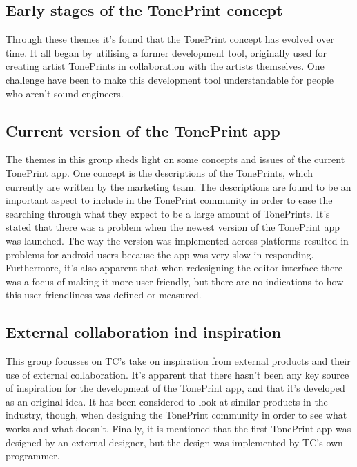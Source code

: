 \subsection*{Early stages of the TonePrint concept}
Through these themes it's found that the TonePrint concept has evolved over time. It all began by utilising a former development tool, originally used for creating artist TonePrints in collaboration with the artists themselves. One challenge have been to make this development tool understandable for people who aren't sound engineers.

\subsection*{Current version of the TonePrint app}
The themes in this group sheds light on some concepts and issues of the current TonePrint app. One concept is the descriptions of the TonePrints, which currently are written by the marketing team. The descriptions are found to be an important aspect to include in the TonePrint community in order to ease the searching through what they expect to be a large amount of TonePrints. It's stated that there was a problem when the newest version of the TonePrint app was launched. The way the version was implemented across platforms resulted in problems for android users because the app was very slow in responding. Furthermore, it's also apparent that when redesigning the editor interface there was a focus of making it more user friendly, but there are no indications to how this user friendliness was defined or measured.

\subsection*{External collaboration ind inspiration}
This group focusses on TC's take on inspiration from external products and their use of external collaboration. It's apparent that there hasn't been any key source of inspiration for the development of the TonePrint app, and that it's developed as an original idea. It has been considered to look at similar products in the industry, though, when designing the TonePrint community in order to see what works and what doesn't. Finally, it is mentioned that the first TonePrint app was designed by an external designer, but the design was implemented by TC's own programmer.  



